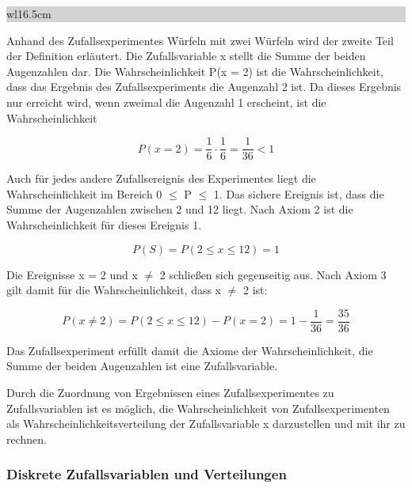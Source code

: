 \noindent
\colorbox{lightgray}{%
%
\renewcommand\arraystretch{0.6}%
\begin{tabular}{ wl{16.5cm} }
{}
\end{tabular}%
}\medskip

\noindent Anhand des Zufallsexperimentes W\"{u}rfeln mit zwei W\"{u}rfeln wird der zweite Teil der Definition erl\"{a}utert. Die Zufallsvariable x stellt die Summe der beiden Augenzahlen dar. Die Wahrscheinlichkeit P(x = 2) ist die Wahrscheinlichkeit, dass das Ergebnis des Zufallsexperiments die Augenzahl 2 ist. Da dieses Ergebnis nur erreicht wird, wenn zweimal die Augenzahl 1 erscheint, ist die Wahrscheinlichkeit

\begin{equation}\label{eq:fourone}
P(x=2)=\dfrac{1}{6} \cdot \dfrac{1}{6} =\dfrac{1}{36} <1   
\end{equation}

\noindent Auch f\"{u}r jedes andere Zufallsereignis des Experimentes liegt die Wahrscheinlichkeit im Bereich 0 $\leq$ P $\leq$ 1. Das sichere Ereignis ist, dass die Summe der Augenzahlen zwischen 2 und 12 liegt. Nach Axiom 2 ist die Wahrscheinlichkeit f\"{u}r dieses Ereignis 1. 

\begin{equation}\label{eq:fourtwo}
P(S)=P(2\le x\le 12)=1   
\end{equation}

\noindent Die Ereignisse x = 2 und x $\neq$ 2 schlie{\ss}en sich gegenseitig aus. Nach Axiom 3 gilt damit f\"{u}r die Wahrscheinlichkeit, dass x $\neq$ 2 ist: 

\begin{equation}\label{eq:fourthree}
P(x\ne 2)=P(2\le x\le 12)-P(x=2)=1-\dfrac{1}{36} =\dfrac{35}{36}
\end{equation}

\noindent Das Zufallsexperiment erf\"{u}llt damit die Axiome der Wahrscheinlichkeit, die Summe der beiden Augenzahlen ist eine Zufallsvariable.

\noindent Durch die Zuordnung von Ergebnissen eines Zufallsexperimentes zu Zufallsvariablen ist es m\"{o}glich, die Wahrscheinlichkeit von Zufallsexperimenten als Wahrscheinlichkeitsverteilung der Zufallsvariable x darzustellen und mit ihr zu rechnen. 

\clearpage 

\subsubsection{Diskrete Zufallsvariablen und Verteilungen}


